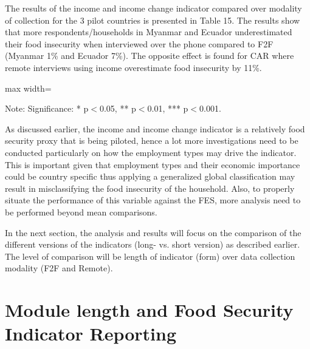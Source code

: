\documentclass[11pt,harvard]{article}
\begin{document}
The results of the income and income change indicator compared over modality of collection for the 3 pilot countries is presented in Table 15. The results show that more respondents/households in Myanmar and Ecuador underestimated their food insecurity when interviewed over the phone compared to F2F (Myanmar 1\% and Ecuador 7\%). The opposite effect is found for CAR where remote interviews using income overestimate food insecurity by 11\%.    

\begin{table}[htbp]
	\centering
	\begin{adjustbox}{max width=\textwidth}
		\begin{threeparttable}
			\caption{Impact of Survey Modality on Income}
			\scriptsize
			 
			\label{tab:INC_Modality_All_Country}
			\begin{tablenotes}
				\item Note: Significance: * p$<$0.05, ** p$<$0.01, *** p$<$0.001. 
			\end{tablenotes}
		\end{threeparttable}
	\end{adjustbox}
\end{table}

As discussed earlier, the income and income change indicator is a relatively food security proxy that is being piloted, hence a lot more investigations need to be conducted particularly on how the employment types may drive the indicator. This is important given that employment types and their economic importance could be country specific thus applying a generalized global classification may result in misclassifying the food insecurity of the household. Also, to properly situate the performance of this variable against the FES, more analysis need to be performed beyond mean comparisons.


In the next section, the analysis and results will focus on the comparison of the different versions of the indicators (long- vs. short version) as described earlier. The level of comparison will be length of indicator (form) over data collection modality (F2F and Remote). 

\pagebreak
	
\section{Module length and Food Security Indicator Reporting}
\end{document}
